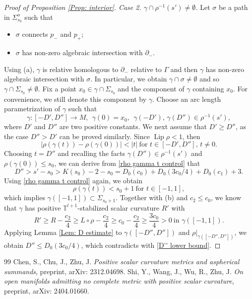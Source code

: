 \documentclass[10pt,a4paper]{amsart}
\DeclareMathOperator{\Lip}{Lip}
\newcommand{\de}{\partial}
\begin{document}
\begin{proof}[Proof of Proposition \ref{Prop: interior}]
{\it Case 2. $\gamma\cap\rho^{-1}(s')\neq\emptyset$.} Let $\sigma$ be a path in $\Sigma_{s_{0}}^{o}$ such that
\begin{itemize}\setlength{\itemsep}{1mm}
\item $\sigma$ connects $p_{-}$ and $p_{+}$;
\item $\sigma$ has non-zero algebraic intersection with $\de_{-}$.
\end{itemize}
Using (a), $\gamma$ is relative homologous to $\de_{-}$ relative to $\Gamma$ and then $\gamma$ has non-zero algebraic intersection with $\sigma$. In particular, we obtain $\gamma\cap\sigma\neq\emptyset$ and so $\gamma\cap\Sigma_{s_{0}}\neq\emptyset$. Fix a point $x_{0}\in\gamma\cap\Sigma_{s_{0}}$ and the component of $\gamma$ containing $x_{0}$. For convenience, we still denote this component by $\gamma$. Choose an arc length parametrization of $\gamma$ such that
\[
\gamma:[-D',D'']\to M, \ \
\gamma(0) = x_{0}, \ \
\gamma(-D'),\,\gamma(D'') \in \rho^{-1}(s'),
\]
where $D'$ and $D''$ are two positive constants. We next assume that $D'\geq D''$, as the case $D''>D'$ can be proved similarly. Since $\Lip\rho <1$, then
\begin{equation}\label{rho gamma t control}
|\rho(\gamma(t))-\rho(\gamma(0))| < |t| \ \text{for $t\in[-D',D''] ,\, t \neq 0$}.
\end{equation}
Choosing $t=D''$ and recalling the facts $\gamma(D'') \in \rho^{-1}(s')$ and $\rho(\gamma(0))\leq s_0$, we can derive from \eqref{rho gamma t control} that
\begin{equation}\label{D'' lower bound}
D'' > s' - s_{0} > K(s_{0})-2-s_{0} = D_{0}(c_{0})+D_{0}(3c_{0}/4)+D_0(c_1)+3.
\end{equation}
Using \eqref{rho gamma t control} again, we obtain
\[
\rho(\gamma(t)) < s_{0}+1 \ \text{for $t\in[-1,1]$},
\]
which implies $\gamma([-1,1])\subset\Sigma_{s_{0}+1}$. Together with (b) and $c_{2}\leq c_{0}$, we know that $\gamma$ has positive $\mathbb T^{l+1}$-stabilized scalar curvature $R'$ with
\[
R' \geq R-\frac{c_{2}}{4} \geq L\circ \rho-\frac{c_{2}}{4} \geq c_{0}-\frac{c_{2}}{4} \geq \frac{3c_{0}}{4} > 0 \ \text{in $\gamma([-1,1])$}.
\]
Applying Lemma \ref{Lem: D estimate} to $\gamma([-D'',D''])$ and $\rho|_{\gamma([-D'',D''])}$, we obtain $D''\leq D_{0}(3c_{0}/4)$, which contradicts with \eqref{D'' lower bound}.
\end{proof}

\begin{thebibliography}{99}
 Chen, S., Chu, J., Zhu, J. {\em Positive scalar curvature metrics and aspherical summands}, preprint, arXiv: 2312.04698.
\bibitem[SWWZ24]{SWWZ24} Shi, Y., Wang, J., Wu, R., Zhu, J. {\em On open manifolds admitting no complete metric with positive scalar curvature}, preprint, arXiv: 2404.01660.
\end{thebibliography}
\end{document}
